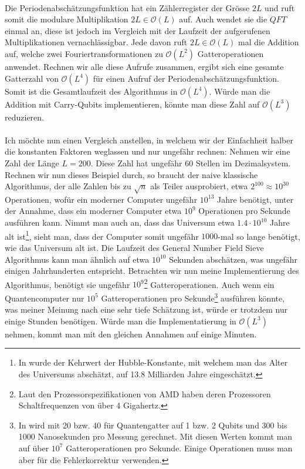 \paragraph{}
Die Periodenabschätzungsfunktion hat ein Zählerregister der Grösse $2L$ und ruft somit die modulare Multiplikation $2L \in \mathcal O(L)$ auf. Auch wendet sie die $QFT$ einmal an, diese ist jedoch im Vergleich mit der Laufzeit der aufgerufenen Multiplikationen vernachlässigbar. Jede davon ruft $2L \in \mathcal O(L)$ mal die Addition auf, welche zwei Fouriertransformationen zu $\mathcal O(L^2)$ Gatteroperationen anwendet. Rechnen wir alle diese Aufrufe zusammen, ergibt sich eine gesamte Gatterzahl von $\mathcal O(L^4)$ für einen Aufruf der Periodenabschätzungsfunktion. Somit ist die Gesamtlaufzeit des Algorithmus in $\mathcal O(L^4)$. Würde man die Addition mit Carry-Qubits implementieren, könnte man diese Zahl auf $\mathcal O(L^3)$ reduzieren.

\paragraph{}

Ich möchte nun einen Vergleich anstellen, in welchem wir der Einfachheit halber die konstanten Faktoren weglassen und nur ungefähr rechnen: Nehmen wir eine Zahl der Länge $L = 200$. Diese Zahl hat ungefähr $60$ Stellen im Dezimalsystem. Rechnen wir nun dieses Beispiel durch, so braucht der naive klassische Algorithmus, der alle Zahlen bis zu $\sqrt{n}$ als Teiler ausprobiert, etwa $2^{100} \approx 10^{30}$ Operationen, wofür ein moderner Computer ungefähr $10^{13}$ Jahre benötigt, unter der Annahme, dass ein moderner Computer etwa $10^9$ Operationen pro Sekunde ausführen kann. Nimmt man auch an, dass das Universum etwa $1.4 \cdot 10^{10}$ Jahre alt ist\footnote{In \cite{ageu} wurde der Kehrwert der Hubble-Konstante, mit welchem man das Alter des Universums abschätzt, auf 13.8 Milliarden Jahre eingeschätzt.}, sieht man, dass der Computer somit ungefähr $1000$-mal so lange benötigt, wie das Universum alt ist. Die Laufzeit des General Number Field Sieve Algorithmus kann man ähnlich auf etwa $10^{10}$ Sekunden abschätzen, was ungefähr einigen Jahrhunderten entspricht. Betrachten wir nun meine Implementierung des Algorithmus, benötigt sie ungefähr $10^9$\footnote{Laut den Prozessorspezifikationen von AMD \cite{amdpr} haben deren Prozessoren Schaltfrequenzen von über 4 Gigahertz.} Gatteroperationen. Auch wenn ein Quantencomputer nur $10^5$ Gatteroperationen pro Sekunde\footnote{In \cite{eqasm} wird mit 20 bzw. 40 für Quantengatter auf 1 bzw. 2 Qubits und 300 bis 1000 Nanosekunden pro Messung gerechnet. Mit diesen Werten kommt man auf über $10^7$ Gatteroperationen pro Sekunde. Einige Operationen muss man aber für die Fehlerkorrektur verwenden.} ausführen könnte, was meiner Meinung nach eine sehr tiefe Schätzung ist, würde er trotzdem nur einige Stunden benötigen. Würde man die Implementatierung in $\mathcal O(L^3)$ nehmen, kommt man mit den gleichen Annahmen auf einige Minuten.